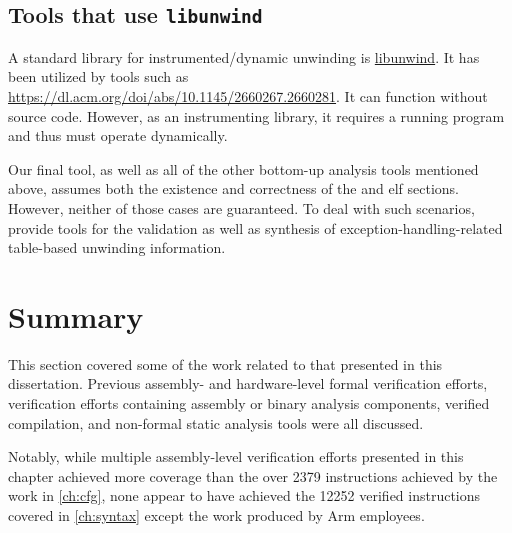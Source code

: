 \subsection{Tools that use \texttt{libunwind}}
A standard library for instrumented/dynamic unwinding is
\href{https://www.nongnu.org/libunwind/}{libunwind}. 
It has been utilized by tools such as \url{https://dl.acm.org/doi/abs/10.1145/2660267.2660281}.
It can function without source code. However, as an instrumenting library, it requires a running program and thus must operate dynamically.

Our final tool, as well as all of the other bottom-up analysis tools mentioned above, assumes both the existence and correctness of the  and  \ac{elf} sections.
However, neither of those cases are guaranteed.
To deal with such scenarios, \textcite{bastian2019dwarf} provide tools for the validation as well as synthesis of exception-handling-related table-based unwinding information.

%
%
%
%

\section{Summary}
This section covered some of the work related to that presented in this dissertation.
Previous assembly- and hardware-level formal verification efforts,
verification efforts containing assembly or binary analysis components,
verified compilation, and non-formal static analysis tools were all discussed.

Notably, while multiple assembly-level verification efforts
presented in this chapter achieved more coverage
than the over \num{2379} instructions achieved by the work in \cref{ch:cfg},
none appear to have achieved the \num{12252}
verified instructions covered in \cref{ch:syntax} except the work produced by
Arm employees.


